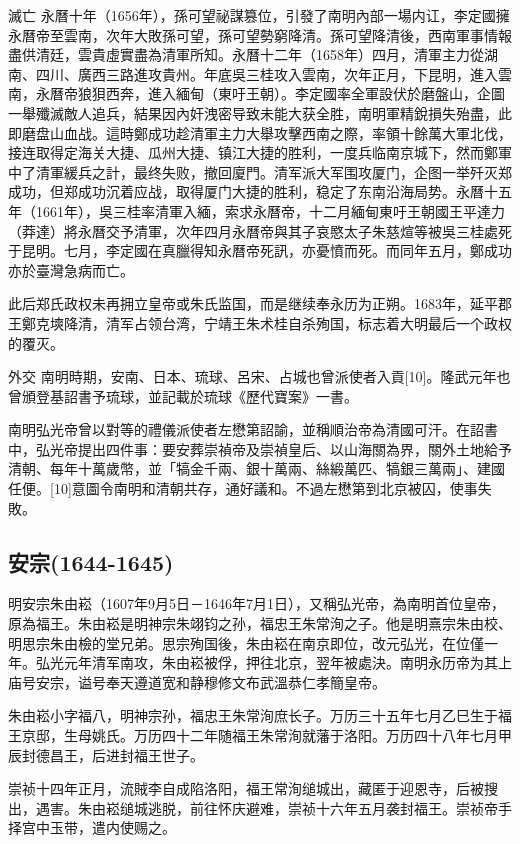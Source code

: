 滅亡
永曆十年（1656年），孫可望祕謀篡位，引發了南明內部一場内讧，李定國擁永曆帝至雲南，次年大敗孫可望，孫可望勢窮降清。孫可望降清後，西南軍事情報盡供清廷，雲貴虛實盡為清軍所知。永曆十二年（1658年）四月，清軍主力從湖南、四川、廣西三路進攻貴州。年底吳三桂攻入雲南，次年正月，下昆明，進入雲南，永曆帝狼狽西奔，進入緬甸（東吁王朝）。李定國率全軍設伏於磨盤山，企圖一舉殲滅敵人追兵，結果因內奸洩密导致未能大获全胜，南明軍精銳損失殆盡，此即磨盘山血战。這時鄭成功趁清軍主力大舉攻擊西南之際，率領十餘萬大軍北伐，接连取得定海关大捷、瓜州大捷、镇江大捷的胜利，一度兵临南京城下，然而鄭軍中了清軍緩兵之計，最终失败，撤回廈門。清军派大军围攻厦门，企图一举歼灭郑成功，但郑成功沉着应战，取得厦门大捷的胜利，稳定了东南沿海局势。永曆十五年（1661年），吳三桂率清軍入緬，索求永曆帝，十二月緬甸東吁王朝國王平達力（莽達）將永曆交予清軍，次年四月永曆帝與其子哀愍太子朱慈煊等被吳三桂處死于昆明。七月，李定國在真臘得知永曆帝死訊，亦憂憤而死。而同年五月，鄭成功亦於臺灣急病而亡。

此后郑氏政权未再拥立皇帝或朱氏监国，而是继续奉永历为正朔。1683年，延平郡王鄭克塽降清，清军占领台湾，宁靖王朱术桂自杀殉国，标志着大明最后一个政权的覆灭。

外交
南明時期，安南、日本、琉球、呂宋、占城也曾派使者入貢[10]。隆武元年也曾頒登基詔書予琉球，並記載於琉球《歷代寶案》一書。

南明弘光帝曾以對等的禮儀派使者左懋第詔諭，並稱順治帝為清國可汗。在詔書中，弘光帝提出四件事：要安葬崇禎帝及崇禎皇后、以山海關為界，關外土地給予清朝、每年十萬歲幣，並「犒金千兩、銀十萬兩、絲緞萬匹、犒銀三萬兩」、建國任便。[10]意圖令南明和清朝共存，通好議和。不過左懋第到北京被囚，使事失敗。

\subsection{安宗\tiny(1644-1645)}

明安宗朱由崧（1607年9月5日－1646年7月1日），又稱弘光帝，為南明首位皇帝，原為福王。朱由崧是明神宗朱翊钧之孙，福忠王朱常洵之子。他是明熹宗朱由校、明思宗朱由檢的堂兄弟。思宗殉国後，朱由崧在南京即位，改元弘光，在位僅一年。弘光元年清军南攻，朱由崧被俘，押往北京，翌年被處決。南明永历帝为其上庙号安宗，谥号奉天遵道宽和静穆修文布武溫恭仁孝簡皇帝。

朱由崧小字福八，明神宗孙，福忠王朱常洵庶长子。万历三十五年七月乙巳生于福王京邸，生母姚氏。万历四十二年随福王朱常洵就藩于洛阳。万历四十八年七月甲辰封德昌王，后进封福王世子。

崇祯十四年正月，流賊李自成陷洛阳，福王常洵缒城出，藏匿于迎恩寺，后被搜出，遇害。朱由崧缒城逃脱，前往怀庆避难，崇祯十六年五月袭封福王。崇祯帝手择宫中玉带，遣内使赐之。

